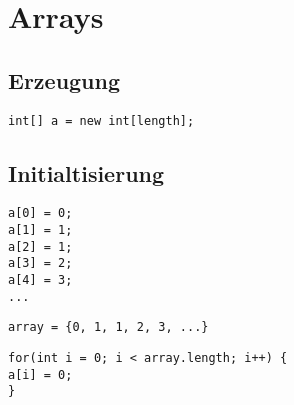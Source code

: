 



\section{Arrays}

\subsection{Erzeugung}
\begin{lstlisting}[caption=Array Erzeugung]
int[] a = new int[length];
\end{lstlisting}

\subsection{Initialtisierung}
\begin{lstlisting}[caption=Array Initialisierung einzeln]
a[0] = 0; 
a[1] = 1; 
a[2] = 1; 
a[3] = 2; 
a[4] = 3; 
...
\end{lstlisting}
\begin{lstlisting}[caption=Array Initialisierung mit Liste]
array = {0, 1, 1, 2, 3, ...}
\end{lstlisting}
\begin{lstlisting}[caption=Array Initialisierung mit for Schleife]
for(int i = 0; i < array.length; i++) {
a[i] = 0;
}
\end{lstlisting}
